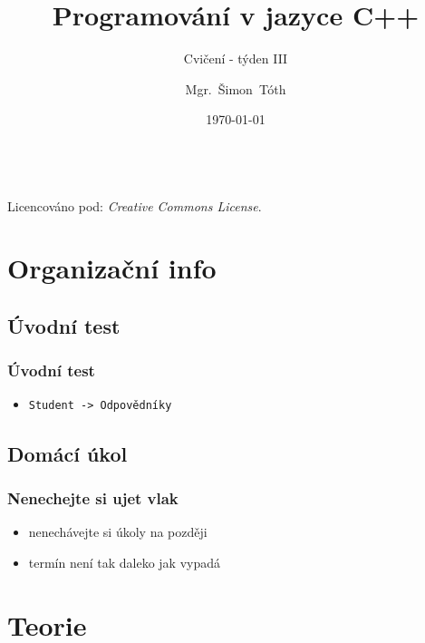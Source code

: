 

\title{Programování v jazyce C++}
\subtitle{Cvičení - týden III}
\author[]{Mgr.~Šimon~Tóth}
\date{\today}

\newcommand{\CcNote}[1]{%
        Licencováno pod: \textit{Creative Commons #1 3.0 License}.%
}


        \begin{frame}
                \titlepage
                \vfill
                \begin{center}
                \\
                {\tiny\CcNote{\CcLongnameByNcSa}}
                \vspace*{2ex}
                \end{center}
        \end{frame}

\section{Organizační info}
\subsection{Úvodní test}

\begin{frame}
	\frametitle{Úvodní test}
	\begin{itemize}
		\item{\texttt{Student -> Odpovědníky}}
	\end{itemize}
\end{frame}

\subsection{Domácí úkol}

\begin{frame}
	\frametitle{Nenechejte si ujet vlak}
	\begin{itemize}
		\item{nenechávejte si úkoly na později}
		\item{termín není tak daleko jak vypadá}
	\end{itemize}
\end{frame}

\section{Teorie}

